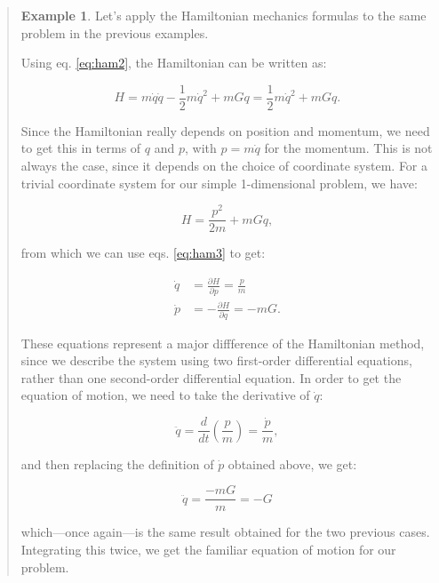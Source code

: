 \documentclass[
  9pt,
]{extbook}
\theoremstyle{definition}
\theoremstyle{definition}
\newtheorem{example}{Example}[chapter]
\theoremstyle{definition}
\theoremstyle{remark}
\begin{document}
\begin{quote}
\begin{example}
\protect\hypertarget{exm:hamex1}{}{\label{exm:hamex1} }Let's apply the Hamiltonian mechanics formulas to the same problem in the previous examples.

Using eq. \eqref{eq:ham2}, the Hamiltonian can be written as:

\begin{equation}
H = m\dot{q}\dot{q} - \frac{1}{2}m\dot{q}^2+mGq = \frac{1}{2}m\dot{q}^2+mGq.
\label{eq:ham4}
\end{equation}

Since the Hamiltonian really depends on position and momentum, we need to get this in terms of \(q\) and \(p\), with \(p = m\dot{q}\) for the momentum. This is not always the case, since it depends on the choice of coordinate system. For a trivial coordinate system for our simple 1-dimensional problem, we have:

\begin{equation}
H=\frac{p^2}{2m}+mGq,
\end{equation}

from which we can use eqs. \eqref{eq:ham3} to get:

\begin{equation}
\begin{aligned}
\dot{q} &= \frac{\partial H}{\partial p} = \frac{p}{m} \\
\dot{p} &=-\frac{\partial H}{\partial q} = -mG.
\end{aligned}
\end{equation}

These equations represent a major diffference of the Hamiltonian method, since we describe the system using two first-order differential equations, rather than one second-order differential equation. In order to get the equation of motion, we need to take the derivative of \(\dot{q}\):

\begin{equation}
\ddot{q} = \frac{d}{dt} \left( \frac{p}{m} \right) = \frac{\dot{p}}{m},
\end{equation}

and then replacing the definition of \(\dot{p}\) obtained above, we get:

\begin{equation}
\ddot{q} = \frac{-mG}{m} = -G
\end{equation}

which---once again---is the same result obtained for the two previous cases. Integrating this twice, we get the familiar equation of motion for our problem.
\end{example}
\end{quote}
\end{document}
